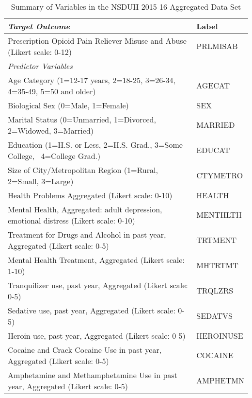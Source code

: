 \\\documentclass[sigconf]{acmart}
\begin{document}

\begin{table*}[ht]
  \caption{Summary of Variables in the NSDUH 2015-16 Aggregated Data Set}
  \label{tab:freq}
  \begin{tabular}{ll}
    \toprule
    \textit{Target Outcome} & Label \\
    \midrule
    Prescription Opioid Pain Reliever Misuse and Abuse (Likert scale: 0-12)& PRLMISAB  \\
    \midrule
    \textit{Predictor Variables}&   \\
    \midrule
    Age Category (1=12-17 years, 2=18-25, 3=26-34, 4=35-49, 5=50 and older)& AGECAT \\
    Biological Sex (0=Male, 1=Female)& SEX  \\
    Marital Status (0=Unmarried, 1=Divorced, 2=Widowed, 3=Married)& MARRIED  \\
    Education (1=H.S. or Less, 2=H.S. Grad., 3=Some College,  4=College Grad.)& EDUCAT  \\
    Size of City/Metropolitan Region (1=Rural, 2=Small, 3=Large)& CTYMETRO  \\
    Health Problems Aggregated  (Likert scale: 0-10)& HEALTH  \\
    Mental Health, Aggregated: adult depression, emotional distress (Likert scale: 0-10)& MENTHLTH  \\
    Treatment for Drugs and Alcohol in past year, Aggregated (Likert scale: 0-5)& TRTMENT  \\
    Mental Health Treatment, Aggregated (Likert scale: 1-10)& MHTRTMT  \\
    Tranquilizer use, past year, Aggregated (Likert scale: 0-5)& TRQLZRS \\
    Sedative use, past year, Aggregated (Likert scale: 0-5)& SEDATVS  \\
    Heroin use, past year, Aggregated (Likert scale: 0-5)& HEROINUSE  \\
    Cocaine and Crack Cocaine Use in past year, Aggregated  (Likert scale: 0-5)& COCAINE  \\
    Amphetamine and Methamphetamine Use in past year, Aggregated (Likert scale: 0-5)& AMPHETMN  \\
    \bottomrule
  \end{tabular}
\end{table*}


\end{document}
